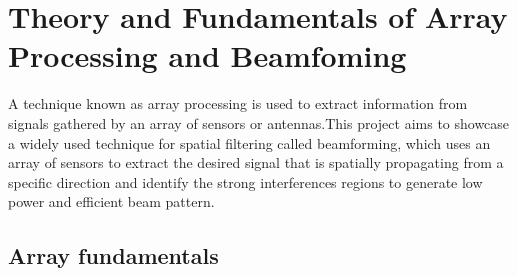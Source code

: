 \chapter{Theory and Fundamentals of Array Processing and Beamfoming}

 A technique known as array processing is used to extract information from signals gathered by an array of sensors or antennas.This project aims to showcase a widely used technique for spatial filtering called beamforming, which uses an array of sensors to extract the desired signal that is spatially propagating from a specific direction and identify the strong interferences regions to generate low power and efficient  beam pattern.

\section{ Array fundamentals}

